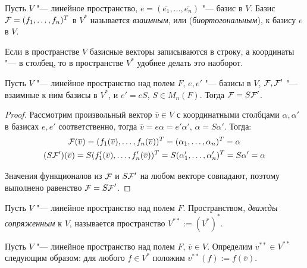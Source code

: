     \begin{definition}
    	Пусть $V$ "--- линейное пространство, $e = (\overline{e_1}, \dots, \overline{e_n})$ "--- базис в $V$. Базис $\FF  = (f_1, \dotsc, f_n)^T$ в $V^*$ называется \textit{взаимным}, или (\textit{биортогональным}), к базису $e$ в $V$.
    \end{definition}
    
    \begin{note}
    	Если в пространстве $V$ базисные векторы записываются в строку, а координаты "--- в столбец, то в пространстве $V^*$ удобнее делать это наоборот.
    \end{note}
    
    \begin{proposition}
    	Пусть $V$ "--- линейное пространство над полем $F$, $e, e'$ "--- базисы в $V$, $\FF , \FF '$ "--- взаимные к ним базисы в $V^*$, и $e' = eS$, $S \in M_n(F)$. Тогда $\FF  = S\FF '$.
    \end{proposition}
    
    \begin{proof}
    	Рассмотрим произвольный вектор $\overline{v} \in V$ с координатными столбцами $\alpha,\alpha'$ в базисах $e, e'$ соответственно, тогда $\overline{v} = e\alpha = e'\alpha'$, $\alpha = S\alpha'$. Тогда:
    	\begin{gather*}
    	\FF (\overline{v}) =
    	(f_1(\overline{v}), \dots, f_n(\overline{v}))^T =
    	(\alpha_1, \dots, \alpha_n)^T =
    	\alpha
    	\\
    	(S\FF ')(\overline{v}) =
    	S(f_1'(\overline{v}), \dots, f_n'(\overline{v}))^T =
    	S(\alpha_1', \dots, \alpha_n')^T =
    	S\alpha' = \alpha
    	\end{gather*}
    	
    	Значения функционалов из $\FF $ и $S\FF '$ на любом векторе совпадают, поэтому выполнено равенство $\FF  = S\FF '$.
    \end{proof}
    
    \begin{definition}
    	Пусть $V$ "--- линейное пространство над полем $F$. Пространством, \textit{дважды сопряженным} к $V$, называется пространство $V^{**} := (V^*)^*$.
    \end{definition}
    
    \begin{definition}
    	Пусть $V$ "--- линейное пространство над полем $F$, $\overline{v} \in V$. Определим $v^{**} \in V^{**}$ следующим образом: для любого $f \in V^*$ положим $v^{**}(f) := f(\overline{v})$.
    \end{definition}
    
